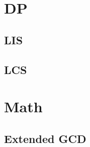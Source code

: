 \section{DP}
    \subsection{LIS}
        
    \subsection{LCS}
        

\section{Math}
    \subsection{Extended GCD}
        